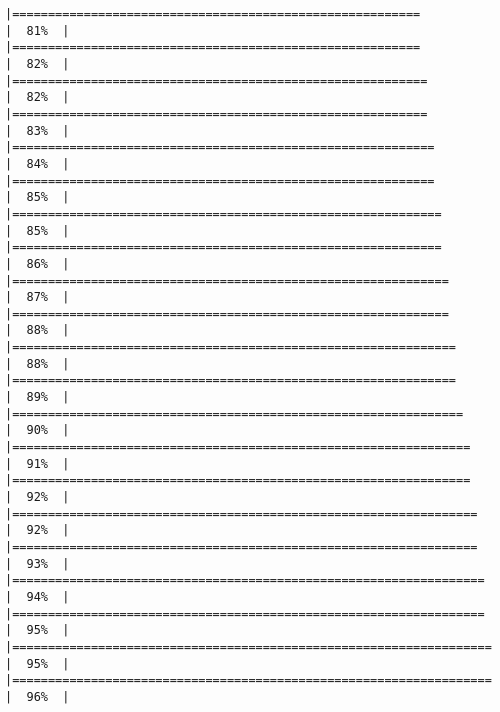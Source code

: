 \documentclass[
]{article}
\begin{document}
\begin{verbatim}
|=========================================================             |  81%  |                                                                              |=========================================================             |  82%  |                                                                              |==========================================================            |  82%  |                                                                              |==========================================================            |  83%  |                                                                              |===========================================================           |  84%  |                                                                              |===========================================================           |  85%  |                                                                              |============================================================          |  85%  |                                                                              |============================================================          |  86%  |                                                                              |=============================================================         |  87%  |                                                                              |=============================================================         |  88%  |                                                                              |==============================================================        |  88%  |                                                                              |==============================================================        |  89%  |                                                                              |===============================================================       |  90%  |                                                                              |================================================================      |  91%  |                                                                              |================================================================      |  92%  |                                                                              |=================================================================     |  92%  |                                                                              |=================================================================     |  93%  |                                                                              |==================================================================    |  94%  |                                                                              |==================================================================    |  95%  |                                                                              |===================================================================   |  95%  |                                                                              |===================================================================   |  96%  |                                                                              
\end{verbatim}
\end{document}
